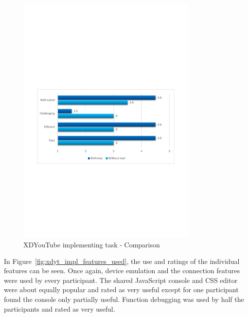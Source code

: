 \begin{figure}[H]
  \centering
    \includegraphics[width=0.8\textwidth]{images/charts/xdyt_impl_comparison.pdf}
	\caption[xdyt-impl: Comparison]{XDYouTube implementing task - Comparison}
	\label{fig:xdyt_impl_comparison}
\end{figure}

In Figure~\ref{fig:xdyt_impl_features_used}, the use and ratings of the individual features can be seen. Once again, device emulation and the connection features were used by every participant. The shared JavaScript console and CSS editor were about equally popular and rated as very useful except for one participant found the console only partially useful. Function debugging was used by half the participants and rated as very useful.

